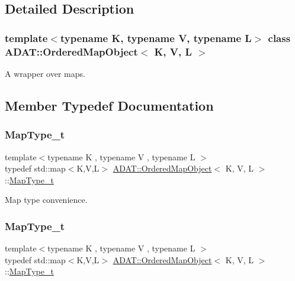 \subsection{Detailed Description}
\subsubsection*{template$<$typename K, typename V, typename L$>$\newline
class A\+D\+A\+T\+::\+Ordered\+Map\+Object$<$ K, V, L $>$}

A wrapper over maps. 

\subsection{Member Typedef Documentation}
\mbox{\label{classADAT_1_1OrderedMapObject_a4341262d590e4628319a61210534ab88}} 
\subsubsection{\texorpdfstring{MapType\_t}{MapType\_t}\hspace{0.1cm}{\footnotesize\ttfamily [1/2]}}
{\footnotesize\ttfamily template$<$typename K , typename V , typename L $>$ \\
typedef std\+::map$<$K,V,L$>$ \mbox{\hyperlink{classADAT_1_1OrderedMapObject}{A\+D\+A\+T\+::\+Ordered\+Map\+Object}}$<$ K, V, L $>$\+::\mbox{\hyperlink{classADAT_1_1OrderedMapObject_a4341262d590e4628319a61210534ab88}{Map\+Type\+\_\+t}}}



Map type convenience. 

\mbox{\label{classADAT_1_1OrderedMapObject_a4341262d590e4628319a61210534ab88}} 
\subsubsection{\texorpdfstring{MapType\_t}{MapType\_t}\hspace{0.1cm}{\footnotesize\ttfamily [2/2]}}
{\footnotesize\ttfamily template$<$typename K , typename V , typename L $>$ \\
typedef std\+::map$<$K,V,L$>$ \mbox{\hyperlink{classADAT_1_1OrderedMapObject}{A\+D\+A\+T\+::\+Ordered\+Map\+Object}}$<$ K, V, L $>$\+::\mbox{\hyperlink{classADAT_1_1OrderedMapObject_a4341262d590e4628319a61210534ab88}{Map\+Type\+\_\+t}}}



